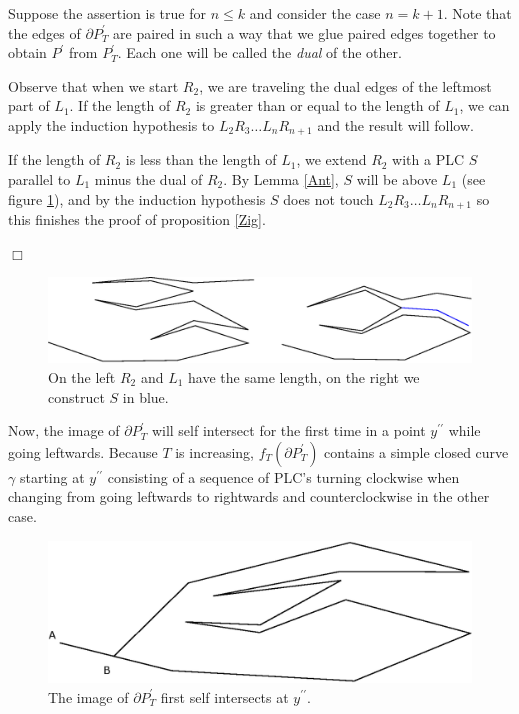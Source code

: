 \documentclass[openright, 12pt]{article}
\begin{document}
Suppose the assertion is true for $n \leq k$ and consider the case $n=k+1$.  Note that the edges of $\partial P^{\prime}_T$ are paired in such a way that we glue paired edges together to obtain $P^{\prime}$ from $P ^{\prime}_T$. Each one will be called the \textit{dual} of the other.

Observe that when we start $R_2$, we are traveling the dual edges of the leftmost part of $L_1$. If the length of $R_2$ is greater than or equal to the length of $L_1$, we can apply the induction hypothesis to $L_2R_3 \ldots L_nR_{n+1}$ and the result will follow. 

If the length of $R_2$ is less than the length of $L_1$, we extend $R_2 $ with a PLC $S$ parallel to $L_1$ minus the dual of $R_2$. By Lemma \ref{Ant}, $S$ will be above $L_1$ (see figure \ref{S}), and by the induction hypothesis $S$ does not touch $L_2R_3 \ldots L_nR_{n+1}$ so this finishes the proof of proposition \ref{Zig}.

\hfill $\Box$



\begin{figure}[h]
\centering
\includegraphics[scale=0.7]{S.eps}
\caption{On the left $R_2$ and $L_1$ have the same length, on the right we construct $S$ in blue.} \label{S}
\end{figure}




Now, the image of $\partial  P^{\prime}_T$ will self intersect for the first time in a point $y^{\prime\prime}$ while going leftwards. Because $T$ is increasing, $f_T(\partial P_T^{\prime})$ contains a simple closed curve $\gamma$ starting at $y^{\prime \prime}$ consisting of a sequence of PLC's turning clockwise when changing from going leftwards to rightwards and counterclockwise in the other case.




\begin{figure}[h]
\centering
{}
\includegraphics[scale=0.7]{Prime.eps}
\caption{The image of $\partial P^{\prime}_T$ first self intersects at $y^{\prime \prime}$.}
\end{figure}
\end{document}
